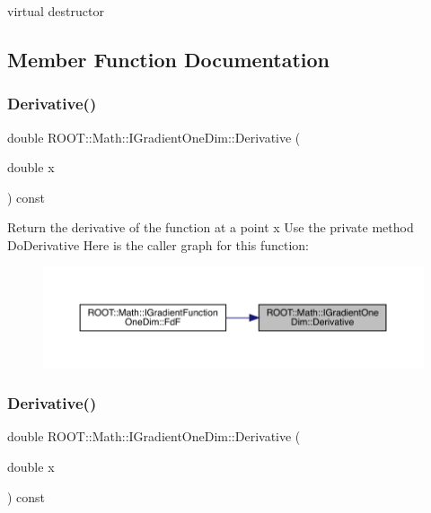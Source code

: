 virtual destructor 



\subsection{Member Function Documentation}
\mbox{\label{classROOT_1_1Math_1_1IGradientOneDim_a1fd109c1ddc7bae1c647f096e1fd527f}} 
\subsubsection{\texorpdfstring{Derivative()}{Derivative()}\hspace{0.1cm}{\footnotesize\ttfamily [1/6]}}
{\footnotesize\ttfamily double R\+O\+O\+T\+::\+Math\+::\+I\+Gradient\+One\+Dim\+::\+Derivative (\begin{DoxyParamCaption}\item[{double}]{x }\end{DoxyParamCaption}) const\hspace{0.3cm}{\ttfamily [inline]}}

Return the derivative of the function at a point x Use the private method Do\+Derivative Here is the caller graph for this function\+:
\nopagebreak
\begin{figure}[H]
\begin{center}
\leavevmode
\includegraphics[width=350pt]{da/d8e/classROOT_1_1Math_1_1IGradientOneDim_a1fd109c1ddc7bae1c647f096e1fd527f_icgraph}
\end{center}
\end{figure}
\mbox{\label{classROOT_1_1Math_1_1IGradientOneDim_a1fd109c1ddc7bae1c647f096e1fd527f}} 
\subsubsection{\texorpdfstring{Derivative()}{Derivative()}\hspace{0.1cm}{\footnotesize\ttfamily [2/6]}}
{\footnotesize\ttfamily double R\+O\+O\+T\+::\+Math\+::\+I\+Gradient\+One\+Dim\+::\+Derivative (\begin{DoxyParamCaption}\item[{double}]{x }\end{DoxyParamCaption}) const\hspace{0.3cm}{\ttfamily [inline]}}

